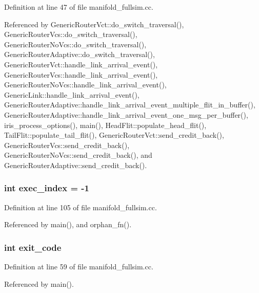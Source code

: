 Definition at line 47 of file manifold\_\-fullsim.cc.

Referenced by GenericRouterVct::do\_\-switch\_\-traversal(), GenericRouterVcs::do\_\-switch\_\-traversal(), GenericRouterNoVcs::do\_\-switch\_\-traversal(), GenericRouterAdaptive::do\_\-switch\_\-traversal(), GenericRouterVct::handle\_\-link\_\-arrival\_\-event(), GenericRouterVcs::handle\_\-link\_\-arrival\_\-event(), GenericRouterNoVcs::handle\_\-link\_\-arrival\_\-event(), GenericLink::handle\_\-link\_\-arrival\_\-event(), GenericRouterAdaptive::handle\_\-link\_\-arrival\_\-event\_\-multiple\_\-flit\_\-in\_\-buffer(), GenericRouterAdaptive::handle\_\-link\_\-arrival\_\-event\_\-one\_\-msg\_\-per\_\-buffer(), iris\_\-process\_\-options(), main(), HeadFlit::populate\_\-head\_\-flit(), TailFlit::populate\_\-tail\_\-flit(), GenericRouterVct::send\_\-credit\_\-back(), GenericRouterVcs::send\_\-credit\_\-back(), GenericRouterNoVcs::send\_\-credit\_\-back(), and GenericRouterAdaptive::send\_\-credit\_\-back().
\subsubsection[{exec\_\-index}]{\setlength{\rightskip}{0pt plus 5cm}int {\bf exec\_\-index} = -1\hspace{0.3cm}{\tt  [static]}}\label{manifold__fullsim_8cc_4afde0d7feaebf12b1542f128c65042a}




Definition at line 105 of file manifold\_\-fullsim.cc.

Referenced by main(), and orphan\_\-fn().
\subsubsection[{exit\_\-code}]{\setlength{\rightskip}{0pt plus 5cm}int {\bf exit\_\-code}}\label{manifold__fullsim_8cc_b1729158be557ef60548f7b7575ea4dd}




Definition at line 59 of file manifold\_\-fullsim.cc.

Referenced by main().
